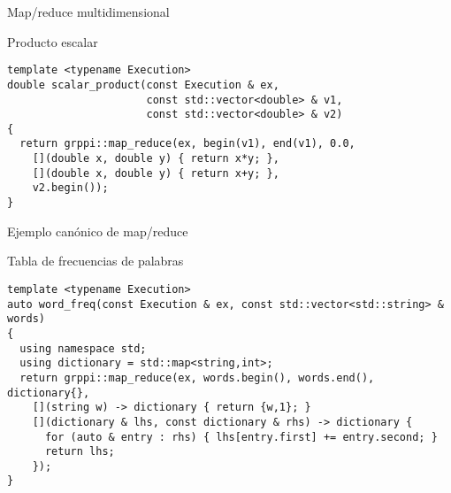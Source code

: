 \begin{frame}[t,fragile]{Map/reduce multidimensional}
\begin{block}{Producto escalar}
\begin{lstlisting}
template <typename Execution>
double scalar_product(const Execution & ex,
                      const std::vector<double> & v1,
                      const std::vector<double> & v2)
{
  return grppi::map_reduce(ex, begin(v1), end(v1), 0.0,
    [](double x, double y) { return x*y; },
    [](double x, double y) { return x+y; },
    v2.begin());
}
\end{lstlisting}
\end{block}
\end{frame}

\begin{frame}[t,fragile]{Ejemplo canónico de map/reduce}
\begin{block}{Tabla de frecuencias de palabras}
\begin{lstlisting}
template <typename Execution>
auto word_freq(const Execution & ex, const std::vector<std::string> & words)
{
  using namespace std;
  using dictionary = std::map<string,int>;
  return grppi::map_reduce(ex, words.begin(), words.end(), dictionary{},
    [](string w) -> dictionary { return {w,1}; }
    [](dictionary & lhs, const dictionary & rhs) -> dictionary {
      for (auto & entry : rhs) { lhs[entry.first] += entry.second; }
      return lhs;
    });
}
\end{lstlisting}
\end{block}
\end{frame}
